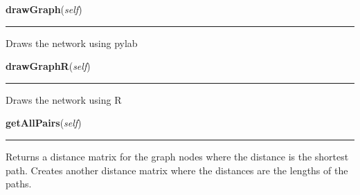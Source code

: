     \label{Epigrass:simobj:graph:drawGraph}

    \vspace{0.5ex}

    \begin{boxedminipage}{\textwidth}

    \raggedright \textbf{drawGraph}(\textit{self})

    \vspace{-1.5ex}

    \rule{\textwidth}{0.5\fboxrule}
    Draws the network using pylab

    \vspace{1ex}

    \end{boxedminipage}

    \label{Epigrass:simobj:graph:drawGraphR}

    \vspace{0.5ex}

    \begin{boxedminipage}{\textwidth}

    \raggedright \textbf{drawGraphR}(\textit{self})

    \vspace{-1.5ex}

    \rule{\textwidth}{0.5\fboxrule}
    Draws the network using R

    \vspace{1ex}

    \end{boxedminipage}

    \label{Epigrass:simobj:graph:getAllPairs}

    \vspace{0.5ex}

    \begin{boxedminipage}{\textwidth}

    \raggedright \textbf{getAllPairs}(\textit{self})

    \vspace{-1.5ex}

    \rule{\textwidth}{0.5\fboxrule}
    Returns a distance matrix for the graph nodes where the distance is the
    shortest path. Creates another distance matrix where the distances are 
    the lengths of the paths.

    \vspace{1ex}

    \end{boxedminipage}

